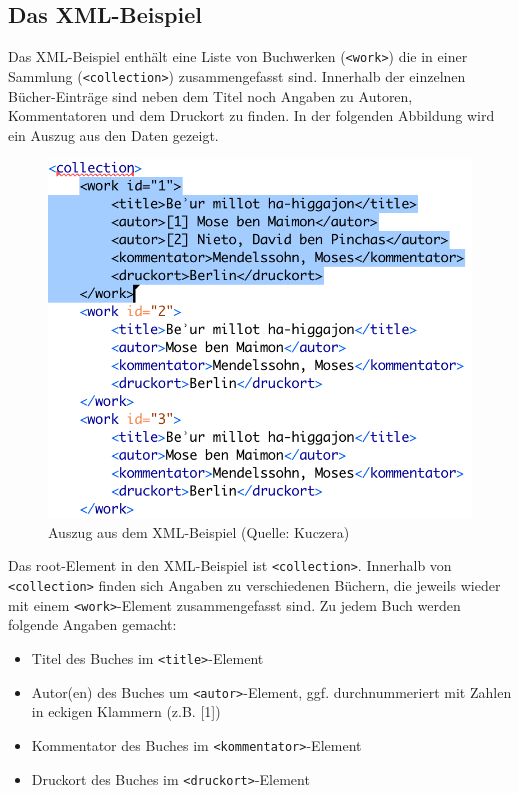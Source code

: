 \hypertarget{das-xml-beispiel}{%
\subsection{Das XML-Beispiel}\label{das-xml-beispiel}}

Das XML-Beispiel enthält eine Liste von Buchwerken
(\texttt{\textless{}work\textgreater{}}) die in einer Sammlung
(\texttt{\textless{}collection\textgreater{}}) zusammengefasst sind.
Innerhalb der einzelnen Bücher-Einträge sind neben dem Titel noch
Angaben zu Autoren, Kommentatoren und dem Druckort zu finden. In der
folgenden Abbildung wird ein Auszug aus den Daten gezeigt.

\begin{figure}
\centering
\includegraphics{./Bilder/kollatz-xml-Beispiel.png}
\caption{Auszug aus dem XML-Beispiel (Quelle: Kuczera)}
\end{figure}

Das root-Element in den XML-Beispiel ist
\texttt{\textless{}collection\textgreater{}}. Innerhalb von
\texttt{\textless{}collection\textgreater{}} finden sich Angaben zu
verschiedenen Büchern, die jeweils wieder mit einem
\texttt{\textless{}work\textgreater{}}-Element zusammengefasst sind. Zu
jedem Buch werden folgende Angaben gemacht:

\begin{itemize}
\tightlist
\item
  Titel des Buches im \texttt{\textless{}title\textgreater{}}-Element
\item
  Autor(en) des Buches um
  \texttt{\textless{}autor\textgreater{}}-Element, ggf. durchnummeriert
  mit Zahlen in eckigen Klammern (z.B. {[}1{]})
\item
  Kommentator des Buches im
  \texttt{\textless{}kommentator\textgreater{}}-Element
\item
  Druckort des Buches im
  \texttt{\textless{}druckort\textgreater{}}-Element
\end{itemize}


